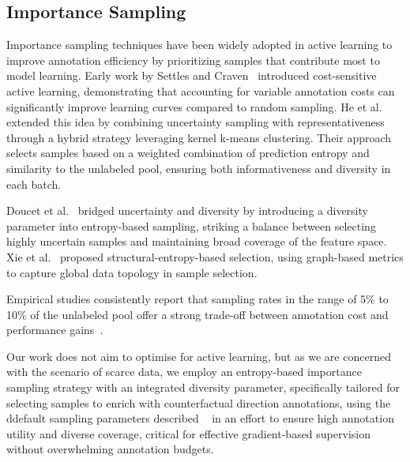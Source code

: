 \documentclass[sigconf,anonymous]{aamas}
\begin{document}
\subsection{Importance Sampling}
Importance sampling techniques have been widely adopted in active learning to improve annotation efficiency by prioritizing samples that contribute most to model learning. Early work by Settles and Craven~\cite{settles2008active} introduced cost-sensitive active learning, demonstrating that accounting for variable annotation costs can significantly improve learning curves compared to random sampling. He et al.~\cite{he2014active} extended this idea by combining uncertainty sampling with representativeness through a hybrid strategy leveraging kernel k-means clustering. Their approach selects samples based on a weighted combination of prediction entropy and similarity to the unlabeled pool, ensuring both informativeness and diversity in each batch.

Doucet et al.~\cite{doucet2024bridging} bridged uncertainty and diversity by introducing a diversity parameter into entropy-based sampling, striking a balance between selecting highly uncertain samples and maintaining broad coverage of the feature space. Xie et al.~\cite{xie2024structural} proposed structural-entropy-based selection, using graph-based metrics to capture global data topology in sample selection.

Empirical studies consistently report that sampling rates in the range of 5\% to 10\% of the unlabeled pool offer a strong trade-off between annotation cost and performance gains~\cite{poms2021low,liu2024utilizing}. 

Our work does not aim to optimise for active learning, but as we are concerned with the scenario of scarce data, we employ an entropy-based importance sampling strategy with an integrated diversity parameter, specifically tailored for selecting samples to enrich with counterfactual direction annotations, using the ddefault sampling parameters described ~\cite{poms2021low,liu2024utilizing} in an effort to ensure high annotation utility and diverse coverage, critical for effective gradient-based supervision without overwhelming annotation budgets.


\end{document}
